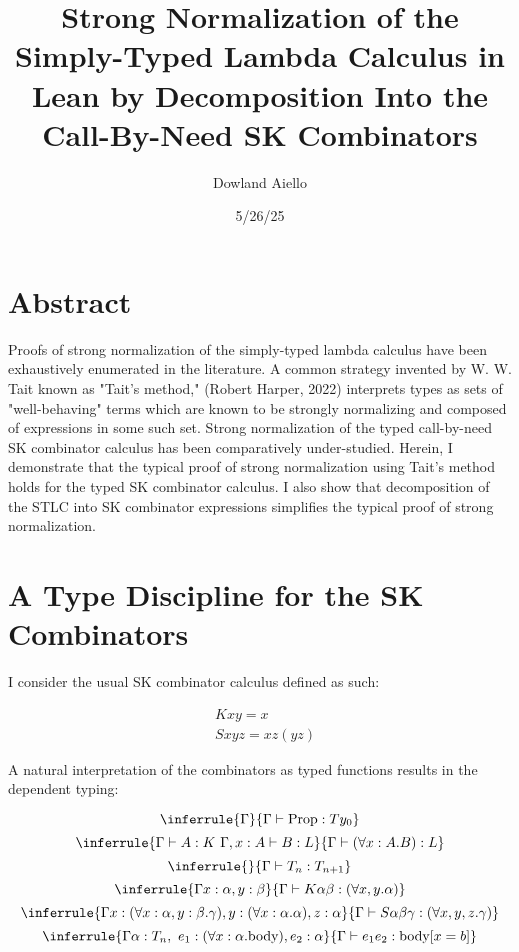 \documentclass[11pt]{article}
\author{Dowland Aiello}
\date{5/26/25}
\title{Strong Normalization of the Simply-Typed Lambda Calculus in Lean by Decomposition Into the Call-By-Need SK Combinators}
\begin{document}
\maketitle
\section{Abstract}
\label{sec:org90ab230}

Proofs of strong normalization of the simply-typed lambda calculus have been exhaustively enumerated in the literature. A common strategy invented by W. W. Tait known as "Tait's method," (Robert Harper, 2022) interprets types as sets of "well-behaving" terms which are known to be strongly normalizing and composed of expressions in some such set.
Strong normalization of the typed call-by-need SK combinator calculus has been comparatively under-studied. Herein, I demonstrate that the typical proof of strong normalization using Tait's method holds for the typed SK combinator calculus. I also show that decomposition of the STLC into SK combinator expressions simplifies the typical proof of strong normalization.
\section{A Type Discipline for the SK Combinators}
\label{sec:org8193386}

I consider the usual SK combinator calculus defined as such:

\begin{align}
& K xy = x \\
& S xyz = xz (yz)
\end{align}

A natural interpretation of the combinators as typed functions results in the dependent typing:

\label{inference:1}

\[
\inferrule
  { \Gamma  }
  { \Gamma \vdash \text{Prop} : Ty_{0} }
\]
\[
\inferrule
  { \Gamma \vdash A : K \ \Gamma,x : A \vdash B : L }
  { \Gamma \vdash (\forall x : A.B) : L}
\]
\[
\inferrule
  { }
  { \Gamma \vdash T_{n} : T_{n + 1} }
\]
\[
\inferrule
  { \Gamma x : \alpha, y : \beta }
  { \Gamma \vdash K \alpha \beta : (\forall x, y.\alpha) }
\]
\[
\inferrule
  { \Gamma x : (\forall x : \alpha, y : \beta.\gamma), y : (\forall x : \alpha.\alpha), z : \alpha }
  { \Gamma \vdash S \alpha \beta \gamma : (\forall x, y, z.\gamma) }
\]
\[
\inferrule
  { \Gamma \alpha : T_{n},\ e_{1} : (\forall x : \alpha.\text{body}), e_{2} : \alpha }
  { \Gamma \vdash e_{1} e_{2} : \text{body}[x = b] }
\]
\end{document}
